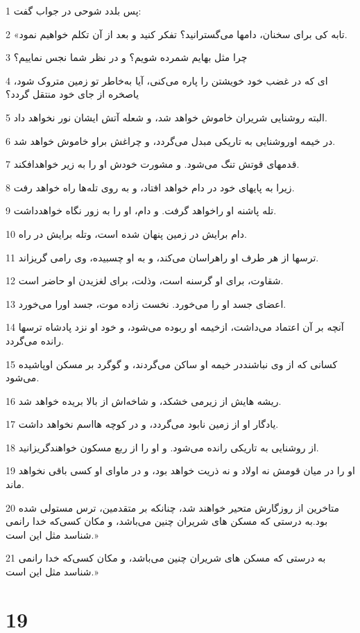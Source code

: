 \par 1 پس بلدد شوحی در جواب گفت:
\par 2 «تابه کی برای سخنان، دامها می‌گسترانید؟ تفکر کنید و بعد از آن تکلم خواهیم نمود.
\par 3 چرا مثل بهایم شمرده شویم؟ و در نظر شما نجس نماییم؟
\par 4 ‌ای که در غضب خود خویشتن را پاره می‌کنی، آیا به‌خاطر تو زمین متروک شود، یاصخره از جای خود منتقل گردد؟
\par 5 البته روشنایی شریران خاموش خواهد شد، و شعله آتش ایشان نور نخواهد داد.
\par 6 در خیمه اوروشنایی به تاریکی مبدل می‌گردد، و چراغش براو خاموش خواهد شد.
\par 7 قدمهای قوتش تنگ می‌شود. و مشورت خودش او را به زیر خواهدافکند.
\par 8 زیرا به پایهای خود در دام خواهد افتاد، و به روی تله‌ها راه خواهد رفت.
\par 9 تله پاشنه او راخواهد گرفت. و دام، او را به زور نگاه خواهدداشت.
\par 10 دام برایش در زمین پنهان شده است، وتله برایش در راه.
\par 11 ترسها از هر طرف او راهراسان می‌کند، و به او چسبیده، وی رامی گریزاند.
\par 12 شقاوت، برای او گرسنه است، وذلت، برای لغزیدن او حاضر است.
\par 13 اعضای جسد او را می‌خورد. نخست زاده موت، جسد اورا می‌خورد.
\par 14 آنچه بر آن اعتماد می‌داشت، ازخیمه او ربوده می‌شود، و خود او نزد پادشاه ترسها رانده می‌گردد.
\par 15 کسانی که از وی نباشنددر خیمه او ساکن می‌گردند، و گوگرد بر مسکن اوپاشیده می‌شود.
\par 16 ریشه هایش از زیرمی خشکد، و شاخه‌اش از بالا بریده خواهد شد.
\par 17 یادگار او از زمین نابود می‌گردد، و در کوچه هااسم نخواهد داشت.
\par 18 از روشنایی به تاریکی رانده می‌شود. و او را از ربع مسکون خواهندگریزانید.
\par 19 او را در میان قومش نه اولاد و نه ذریت خواهد بود، و در ماوای او کسی باقی نخواهد ماند.
\par 20 متاخرین از روزگارش متحیر خواهند شد، چنانکه بر متقدمین، ترس مستولی شده بود.به درستی که مسکن های شریران چنین می‌باشد، و مکان کسی‌که خدا رانمی شناسد مثل این است.»
\par 21 به درستی که مسکن های شریران چنین می‌باشد، و مکان کسی‌که خدا رانمی شناسد مثل این است.»
 
\chapter{19}

